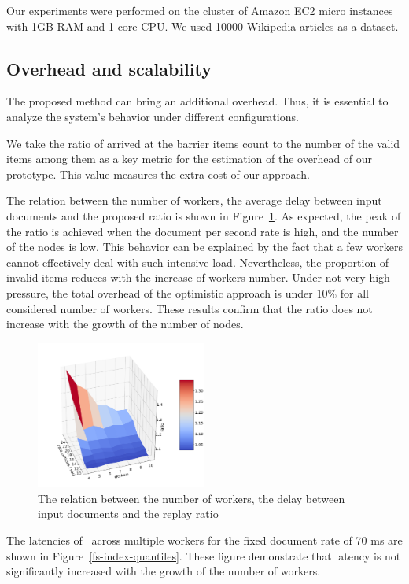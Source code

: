 Our experiments were performed on the cluster of Amazon EC2 micro instances with 1GB RAM and 1 core CPU. We used 10000 Wikipedia articles as a dataset. 

\subsection{Overhead and scalability}
The proposed method can bring an additional overhead. Thus, it is essential to analyze the system's behavior under different configurations.

We take the ratio of arrived at the barrier items count to the number of the valid items among them as a key metric for the estimation of the overhead of our prototype. This value measures the extra cost of our approach.

The relation between the number of workers, the average delay between input documents and the proposed ratio is shown in Figure~\ref{overhead}. As expected, the peak of the ratio is achieved when the document per second rate is high, and the number of the nodes is low. This behavior can be explained by the fact that a few workers cannot effectively deal with such intensive load. Nevertheless, the proportion of invalid items reduces with the increase of workers number. Under not very high pressure, the total overhead of the optimistic approach is under 10\% for all considered number of workers. These results confirm that the ratio does not increase with the growth of the number of nodes.

\begin{figure}[htbp]
  \centering
  \includegraphics[width=0.5\textwidth]{pics/overhead}
  \caption{The relation between the number of workers, the delay between input documents and the replay ratio}
  \label {overhead}
\end{figure}

The latencies of \FlameStream\ across multiple workers for the fixed document rate of 70 ms are shown in Figure~\ref{fs-index-quantiles}. These figure demonstrate that latency is not significantly increased with the growth of the number of workers. 

